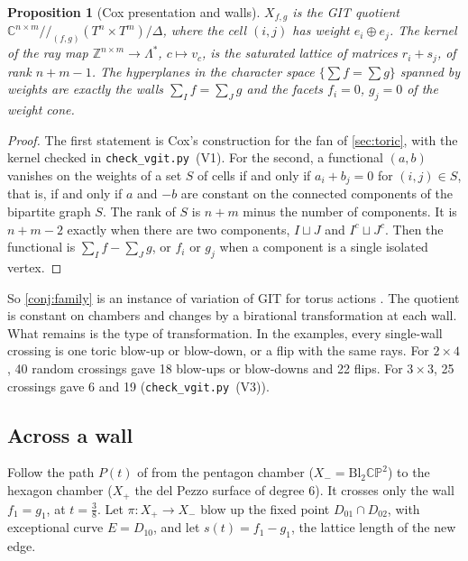 \documentclass[11pt]{article}
\newtheorem{proposition}[theorem]{Proposition}
\theoremstyle{definition}
\theoremstyle{remark}
\begin{document}
\begin{proposition}[Cox presentation and walls]\label{prop:vgit}
$X_{f,g}$ is the GIT quotient $\mathbb C^{n\times m}/\!\!/_{(f,g)}(T^n\times T^m)/\Delta$, where the cell $(i,j)$ has weight $e_i\oplus e_j$. The kernel
of the ray map $\mathbb Z^{n\times m}\to\Lambda^*$, $c\mapsto v_c$, is the saturated lattice of matrices $r_i+s_j$, of rank $n+m-1$. The
hyperplanes in the character space $\{\sum f=\sum g\}$ spanned by weights are exactly the walls $\sum_If=\sum_Jg$ and the facets
$f_i=0$, $g_j=0$ of the weight cone.
\end{proposition}
\begin{proof}
The first statement is Cox's construction \cite{Cox1995} for the fan of \cref{sec:toric}, with the kernel checked in
\texttt{check\_vgit.py}~(V1). For the second, a functional $(a,b)$ vanishes on the weights of a set $S$ of cells if and only if
$a_i+b_j=0$ for $(i,j)\in S$, that is, if and only if $a$ and $-b$ are constant on the connected components of the bipartite
graph $S$. The rank of $S$ is $n+m$ minus the number of components. It is $n+m-2$ exactly when there are two components,
$I\sqcup J$ and $I^c\sqcup J^c$. Then the functional is $\sum_If-\sum_Jg$, or $f_i$ or $g_j$ when a component is a single
isolated vertex.
\end{proof}

So \cref{conj:family} is an instance of variation of GIT for torus actions \cite{Thaddeus1996,DolgachevHu1998}. The
quotient is constant on chambers and changes by a birational transformation at each wall. What remains is the type of
transformation. In the examples, every single-wall crossing is one toric blow-up or blow-down, or a flip with the same rays.
For $2\times4$, 40 random crossings gave 18 blow-ups or blow-downs and 22 flips. For $3\times3$, 25 crossings gave 6 and 19
(\texttt{check\_vgit.py}~(V3)).

\subsection{Across a wall}\label{sec:acrosswall}

Follow the path $P(t)$ of \cite[\S12]{Awasthi-Family} from the pentagon chamber ($X_-=\mathrm{Bl}_2\mathbb{CP}^2$) to the hexagon
chamber ($X_+$ the del Pezzo surface of degree 6). It crosses only the wall $f_1=g_1$, at $t=\frac38$. Let
$\pi\colon X_+\to X_-$ blow up the fixed point $D_{01}\cap D_{02}$, with exceptional curve $E=D_{10}$, and let
$s(t)=f_1-g_1$, the lattice length of the new edge.
\end{document}
